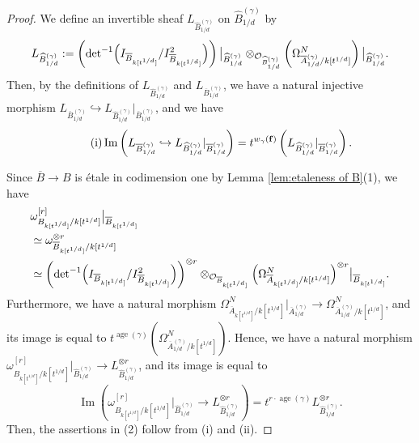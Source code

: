 \documentclass[a4paper,11pt]{amsart}
\theoremstyle{definition}
\theoremstyle{remark}
\begin{document}
\begin{proof}
We define an invertible sheaf $L_{\widehat{B}^{(\gamma)}_{1/d}}$ on $\widehat{B}^{(\gamma)}_{1/d}$ by
\[
L_{\widehat{B}^{(\gamma)}_{1/d}} := \left( \operatorname{det} ^{-1} \Bigl ( I_{\overline{B}_{k[t^{1/d}]}}/ I^2 _{\overline{B}_{k[t^{1/d}]}} \Bigr) \right) \big|_{\widehat{B}^{(\gamma)}_{1/d}} \otimes _{\mathcal{O}_{\widehat{B}^{(\gamma)}_{1/d}}}
\left( \Omega_{\overline{A}^{(\gamma)}_{1/d}/k[t^{1/d}]} ^N \right) \big|_{\widehat{B}^{(\gamma)}_{1/d}}. 
\]
Then, by the definitions of $L_{\widehat{B}^{(\gamma)}_{1/d}}$ and $L_{\overline{B}^{(\gamma)}_{1/d}}$, we have a natural injective morphism $L_{\overline{B}^{(\gamma)}_{1/d}} \hookrightarrow L_{\widehat{B}^{(\gamma)}_{1/d}} |_{\overline{B}^{(\gamma)}_{1/d}}$, 
and we have
\[
\tag{i}
\operatorname{Im} \left ( L_{\overline{B}^{(\gamma)}_{1/d}} \hookrightarrow L_{\widehat{B}^{(\gamma)}_{1/d}} |_{\overline{B}^{(\gamma)}_{1/d}} \right) = t^{w_\gamma({\bf f})} \left( L_{\widehat{B}^{(\gamma)}_{1/d}} |_{\overline{B}^{(\gamma)}_{1/d}} \right).
\]

Since $\overline{B} \to B$ is \'{e}tale in codimension one by Lemma \ref{lem:etaleness of B}(1), we have 
\begin{align*}
& \omega^{[r]} _{B_{k[t^{1/d}]}/k[t^{1/d}]} \big| _{\overline{B}_{k[t^{1/d}]}} \\
& \simeq \omega^{\otimes r} _{\overline{B}_{k[t^{1/d}]}/k[t^{1/d}]} \\
& \simeq \left( \operatorname{det} ^{-1} \Bigl( I_{\overline{B}_{k[t^{1/d}]}}/ I^2_{\overline{B}_{k[t^{1/d}]}} \Bigr) \right)^{\otimes r} \otimes _{\mathcal{O}_{\overline{B}_{k[t^{1/d}]}}} \Bigl ( \Omega_{\overline{A}_{k[t^{1/d}]}/k[t^{1/d}]} ^N \Bigr )^{\otimes r} \big|_{\overline{B}_{k[t^{1/d}]}}. 
\end{align*}
Furthermore, we have a natural morphism $\Omega_{\overline{A}_{k[t^{1/d}]}/k[t^{1/d}]} ^N \big|_{\overline{A}^{(\gamma)}_{1/d}} \to \Omega_{\overline{A}^{(\gamma)}_{1/d}/k[t^{1/d}]} ^N$, and its image is equal to $t^{\operatorname{age}(\gamma)} \left( \Omega_{\overline{A}^{(\gamma)}_{1/d}/k[t^{1/d}]} ^N \right)$. 
Hence, we have a natural morphism $\omega^{[r]} _{B_{k[t^{1/d}]}/k[t^{1/d}]} \big| _{\widehat{B}^{(\gamma)}_{1/d}} \to L_{\widehat{B}^{(\gamma)}_{1/d}}^{\otimes r}$, and its image is equal to
\[
\tag{ii}
\operatorname{Im} \left ( \omega^{[r]} _{B_{k[t^{1/d}]}/k[t^{1/d}]} \big| _{\widehat{B}^{(\gamma)}_{1/d}} \to L_{\widehat{B}^{(\gamma)}_{1/d}}^{\otimes r} \right) =
t^{r \cdot \operatorname{age}(\gamma)} L_{\widehat{B}^{(\gamma)}_{1/d}} ^{\otimes r}. 
\]
Then, the assertions in (2) follow from (i) and (ii). 


\end{proof}
\end{document}
